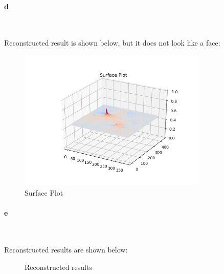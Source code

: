 \documentclass[11pt]{article} \usepackage{fullpage} \usepackage{graphicx} \usepackage{epstopdf} \usepackage{color} \usepackage{psfrag} \usepackage{pdfsync}\usepackage{indentfirst}\usepackage{subfigure}\usepackage{float}\usepackage[section]{placeins}
\begin{document}
\paragraph{d}~{}

Reconstructed result is shown below, but it does not look like a face:
\begin{figure}[H]
\centering
\includegraphics[width=0.8\textwidth]{results/q2d.png}
\caption{Surface Plot}
\end{figure}

\paragraph{e}~{}

Reconstructed results are shown below:
\begin{figure}[H]
\centering
{}
\caption{Reconstructed results}
\end{figure}
\end{document}
